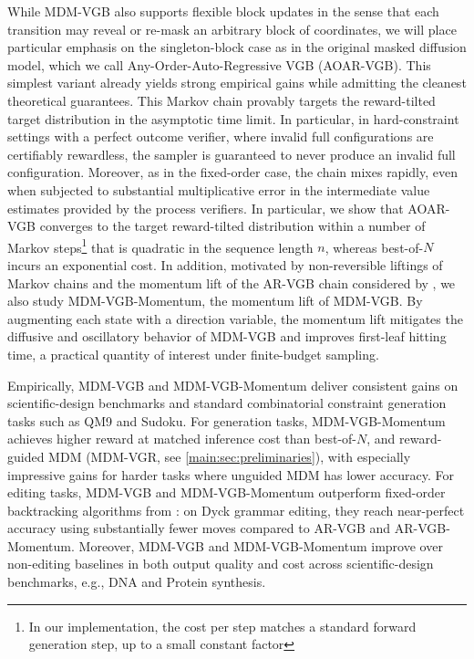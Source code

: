 \documentclass{article}
\numberwithin{theorem}{section}
\numberwithin{proposition}{section}
\numberwithin{corollary}{section}
\numberwithin{lemma}{section}
\numberwithin{conjecture}{section}
\numberwithin{remark}{section}
\numberwithin{definition}{section}
\numberwithin{assumption}{section}
\numberwithin{example}{section}
\begin{document}
While MDM-VGB also supports flexible block updates in the sense that each transition may reveal or re-mask
an arbitrary block of coordinates, we will place
particular emphasis on the
singleton-block case as in the original masked diffusion model, which we call Any-Order-Auto-Regressive VGB (AOAR-VGB). This simplest
variant already yields strong empirical gains while admitting the cleanest theoretical guarantees. This Markov chain provably targets the reward-tilted target distribution in the asymptotic time limit. In particular, in hard-constraint settings with a perfect outcome verifier, where invalid full configurations are certifiably rewardless, the sampler is guaranteed to never produce an invalid full configuration. Moreover, as in the fixed-order case, the chain mixes rapidly, even when subjected to substantial multiplicative error in the intermediate value estimates provided by the process verifiers. In particular, we show that AOAR-VGB converges to the target reward-tilted distribution within a number of Markov steps\footnote{In our implementation, the cost per step matches a standard forward generation step, up to a small constant factor} that is quadratic in the sequence length $n$, whereas best-of-$N$ incurs an exponential cost.
In addition, motivated by non-reversible liftings of Markov chains
\citep{hayes2010liftings} and the momentum lift of the AR-VGB chain considered by
\citet{rohatgi2025taming}, we also study MDM-VGB-Momentum, the momentum lift of MDM-VGB. By augmenting each state with a direction variable, the momentum lift mitigates the diffusive and oscillatory behavior of MDM-VGB and improves first-leaf hitting time, a practical quantity of interest under finite-budget sampling.


Empirically, MDM-VGB and MDM-VGB-Momentum deliver consistent gains on scientific-design benchmarks and standard combinatorial constraint generation tasks such as QM9 and Sudoku.
For generation tasks, MDM-VGB-Momentum achieves higher reward at matched
inference cost than best-of-$N$, and reward-guided MDM  (MDM-VGR, see \cref{main:sec:preliminaries}), with especially impressive gains for harder tasks where unguided MDM has lower accuracy. For editing tasks, MDM-VGB and MDM-VGB-Momentum outperform fixed-order backtracking algorithms from \cite{sinclair1989approximate,rohatgi2025taming}: on Dyck grammar editing, they reach near-perfect accuracy using substantially fewer moves compared to AR-VGB and AR-VGB-Momentum. Moreover, MDM-VGB and MDM-VGB-Momentum improve over non-editing baselines in both output quality and cost across scientific-design benchmarks, e.g., DNA and Protein synthesis.
\end{document}
